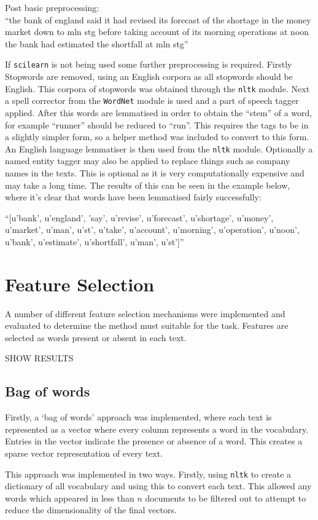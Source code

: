 \documentclass{article}
\begin{document}
Post basic preprocessing:
\\``the bank of england said it had revised its forecast of the shortage in the money market down to mln stg before taking account of its morning operations at noon the bank had estimated the shortfall at mln stg''

If \verb|scilearn| is not being used some further preprocessing is required. Firstly Stopwords are removed, using an English corpora as all stopwords should be English. This corpora of stopwords was obtained through the \verb|nltk| module. Next a spell corrector from the \verb|WordNet| module is used and a part of speech tagger applied. After this words are lemmatised in order to obtain the ``stem'' of a word, for example ``runner'' should be reduced to ``run''. This requires the tags to be in a slightly simpler form, so a helper method was included to convert to this form. An English language lemmatiser is then used from the \verb|nltk| module. Optionally a named entity tagger may also be applied to replace things such as company names in the texts. This is optional as it is very computationally expensive and may take a long time. The results of this can be seen in the example below, where it's clear that words have been lemmatised fairly successfully:

``[u'bank', u'england', 'say', u'revise', u'forecast', u'shortage', u'money', u'market', u'man', u'st', u'take', u'account', u'morning', u'operation', u'noon', u'bank', u'estimate', u'shortfall', u'man', u'st']''

\section{Feature Selection}
A number of different feature selection mechanisms were implemented and evaluated to determine the method must suitable for the task. Features are selected as words present or absent in each text.

SHOW RESULTS

\subsection{Bag of words}
Firstly, a `bag of words' approach was implemented, where each text is represented as a vector where every column represents a word in the vocabulary. Entries in the vector indicate the presence or absence of a word. This creates a sparse vector representation of every text.

This approach was implemented in two ways. Firstly, using \verb|nltk| to create a dictionary of all vocabulary and using this to convert each text. This allowed any words which appeared in less than $n$ documents to be filtered out to attempt to reduce the dimensionality of the final vectors.
\end{document}
